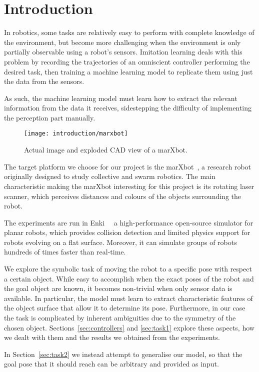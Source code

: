 \section{Introduction}

In robotics, some tasks are relatively easy to perform with complete knowledge 
of the environment, but become more challenging when the environment is only 
partially observable using a robot's sensors. Imitation learning deals with 
this problem by recording the trajectories of an omniscient controller 
performing the desired task, then training a machine learning model to 
replicate them using just the data from the sensors. 

As such, the machine learning model must learn how to extract the relevant 
information from the data it receives, sidestepping the difficulty of 
implementing the perception part manually.

\begin{figure}[htbp]
	\centerline{\texttt{[image: introduction/marxbot]}}
	\caption{Actual image and exploded CAD view of a marXbot.}
	\label{fig:marxbot}
\end{figure}

The target platform we choose for our project is the 
marXbot~\cite{bonani2010marxbot}, a research robot originally designed to study 
collective and swarm robotics. The main characteristic making the marXbot 
interesting for this project is its rotating laser scanner, which perceives 
distances and colours of the objects surrounding the robot.

The experiments are run in Enki~\cite{enki}~\cite{enki-jguzzi} a 
high-performance open-source simulator for planar robots, which provides 
collision detection and limited physics support for robots evolving on a flat 
surface. Moreover, it can simulate groups of robots hundreds of times faster 
than real-time.

We explore the symbolic task of moving the robot to a specific pose with 
respect a certain object. While easy to accomplish when the exact poses of the 
robot and the goal object are known, it becomes non-trivial when only sensor 
data is available. In particular, the model must learn to extract 
characteristic features of the object surface that allow it to determine its 
pose. Furthermore, in our case the task is complicated by inherent ambiguities 
due to the symmetry of the chosen object. Sections~\ref{sec:controllers} and 
\ref{sec:task1} explore these aspects, how we dealt with them and the results 
we obtained from the experiments.

In Section~\ref{sec:task2} we instead attempt to generalise our model, so that 
the goal pose that it should reach can be arbitrary and provided as input.
